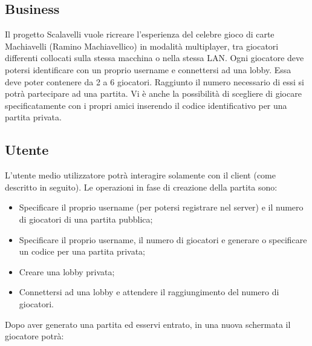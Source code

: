 \subsection{Business}
Il progetto Scalavelli vuole ricreare l’esperienza del celebre gioco di carte Machiavelli (Ramino Machiavellico) in modalità multiplayer, tra giocatori differenti collocati sulla stessa macchina o nella stessa LAN. Ogni giocatore deve potersi identificare con un proprio username e connettersi ad una lobby.
Essa deve poter contenere da 2 a 6 giocatori.
Raggiunto il numero necessario di essi si potrà partecipare ad una partita.
Vi è anche la possibilità di scegliere di giocare specificatamente con i propri amici inserendo il codice identificativo per una partita privata.

\subsection{Utente}
L’utente medio utilizzatore potrà interagire solamente con il client (come descritto in seguito).
Le operazioni in fase di creazione della partita sono:
\begin{itemize}
    \item Specificare il proprio username (per potersi registrare nel server) e il numero di giocatori di una partita pubblica;
    \item Specificare il proprio username, il numero di giocatori e generare o specificare un codice per una partita privata;
    \item Creare una lobby privata;
    \item Connettersi ad una lobby e attendere il raggiungimento del numero di giocatori.
\end{itemize}
Dopo aver generato una partita ed esservi entrato, in una nuova schermata il giocatore potrà:
